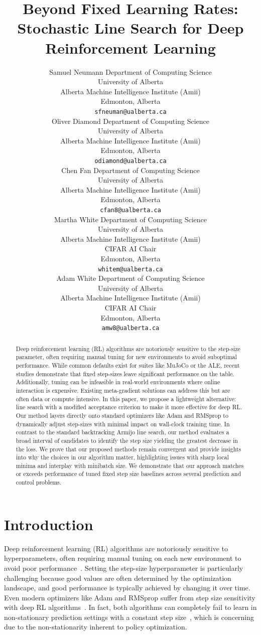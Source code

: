 \documentclass{article}
\title{Beyond Fixed Learning Rates: Stochastic Line Search for Deep Reinforcement Learning}
\author{%
  Samuel Neumann
  Department of Computing Science\\
  University of Alberta\\
  Alberta Machine Intelligence Institute (Amii) \\
  Edmonton, Alberta \\
  \texttt{sfneuman@ualberta.ca} \\
  \And
  Oliver Diamond
  Department of Computing Science\\
  University of Alberta\\
  Alberta Machine Intelligence Institute (Amii) \\
  Edmonton, Alberta \\
  \texttt{odiamond@ualberta.ca} \\
  \AND
  Chen Fan
  Department of Computing Science\\
  University of Alberta\\
  Alberta Machine Intelligence Institute (Amii) \\
  Edmonton, Alberta \\
  \texttt{cfan8@ualberta.ca} \\
  \And
  Martha White
  Department of Computing Science\\
  University of Alberta\\
  Alberta Machine Intelligence Institute (Amii) \\
  CIFAR AI Chair \\
  Edmonton, Alberta \\
  \texttt{whitem@ualberta.ca} \\
  \And
  Adam White
  Department of Computing Science\\
  University of Alberta\\
  Alberta Machine Intelligence Institute (Amii) \\
  CIFAR AI Chair \\
  Edmonton, Alberta \\
  \texttt{amw8@ualberta.ca} \\
}
\begin{document}
\maketitle


\begin{abstract}
Deep reinforcement learning (RL) algorithms are notoriously sensitive to the step-size parameter, often requiring manual tuning for new environments to avoid suboptimal performance. While common defaults exist for suites like MuJoCo or the ALE, recent studies demonstrate that fixed step-sizes leave significant performance on the table. Additionally, tuning can be infeasible in real-world environments where online interaction is expensive. Existing meta-gradient solutions can address this but are often data or compute intensive. In this paper, we propose a lightweight alternative: line search with a modified acceptance criterion to make it more effective for deep RL. Our method layers directly onto standard optimizers like Adam and RMSprop to dynamically adjust step-sizes with minimal impact on wall-clock training time. In contrast to the standard backtracking Armijo line search, our method evaluates a broad interval of candidates to identify the step size yielding the greatest decrease in the loss. We prove that our proposed methods remain convergent and provide insights into why the choices in our algorithm matter, highlighting issues with sharp local minima and interplay with minibatch size. We demonstrate that our approach matches or exceeds performance of tuned fixed step size baselines across several prediction and control problems.
\end{abstract}



\section{Introduction}

Deep reinforcement learning (RL) algorithms are notoriously sensitive to hyperparameters, often requiring manual
tuning on each new environment to avoid poor performance~\citep{eimer2023hyperparameters,adkins2024method}. Setting the step-size hyperparameter is particularly challenging because good values are often determined by the optimization landscape, and good performance is typically achieved by changing it over time. Even modern optimizers like Adam and RMSprop suffer from step size
sensitivity with deep RL algorithms~\citep{ellis2024adam,donancio2024dynamic,jordan2024cliff}. In fact, both algorithms can completely fail to learn in non-stationary prediction settings with a constant step size~\citep{jacobsen2019meta,degris2024step}, which is concerning due to the non-stationarity inherent to policy optimization. 
\end{document}
